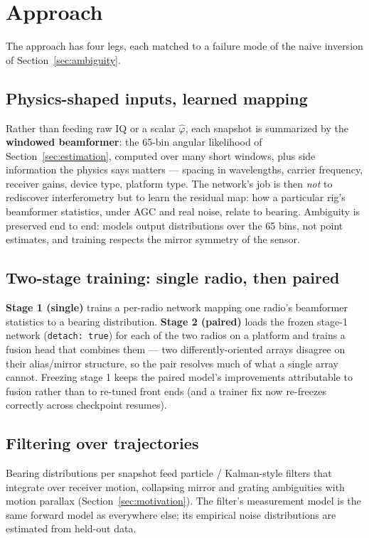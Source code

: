 \section{Approach}
\label{sec:approach}

The approach has four legs, each matched to a failure mode of the naive
inversion of Section~\ref{sec:ambiguity}.

\subsection{Physics-shaped inputs, learned mapping}

Rather than feeding raw IQ or a scalar $\hat\varphi$, each snapshot is
summarized by the \textbf{windowed beamformer}: the 65-bin angular likelihood
of Section~\ref{sec:estimation}, computed over many short windows, plus side
information the physics says matters --- spacing in wavelengths, carrier
frequency, receiver gains, device type, platform type. The network's job is
then \emph{not} to rediscover interferometry but to learn the residual map:
how a particular rig's beamformer statistics, under AGC and real noise,
relate to bearing. Ambiguity is preserved end to end: models output
distributions over the 65 bins, not point estimates, and training respects
the mirror symmetry of the sensor.

\subsection{Two-stage training: single radio, then paired}

\textbf{Stage 1 (single)} trains a per-radio network mapping one radio's
beamformer statistics to a bearing distribution. \textbf{Stage 2 (paired)}
loads the frozen stage-1 network (\texttt{detach: true}) for each of the two
radios on a platform and trains a fusion head that combines them --- two
differently-oriented arrays disagree on their alias/mirror structure, so the
pair resolves much of what a single array cannot. Freezing stage 1 keeps the
paired model's improvements attributable to fusion rather than to re-tuned
front ends (and a trainer fix now re-freezes correctly across checkpoint
resumes).

\subsection{Filtering over trajectories}

Bearing distributions per snapshot feed particle / Kalman-style filters that
integrate over receiver motion, collapsing mirror and grating ambiguities
with motion parallax (Section~\ref{sec:motivation}). The filter's measurement
model is the same forward model as everywhere else; its empirical noise
distributions are estimated from held-out data.

